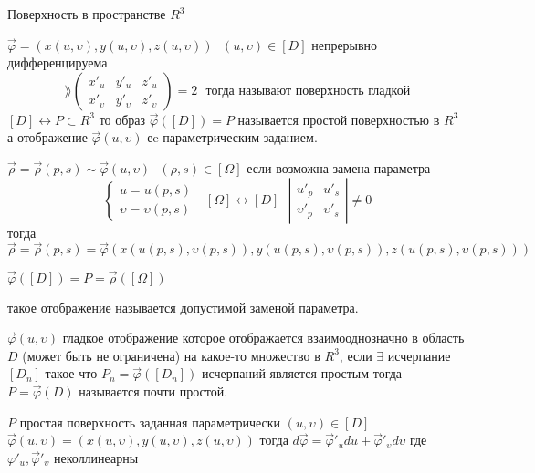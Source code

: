 \begin{title}
  Поверхность в пространстве $R^3$
\end{title}

\begin{define}
  $\vec \varphi = (x(u, \upsilon) , y(u, \upsilon), z(u, \upsilon)) ~~~
  (u, \upsilon) \in [D]$ непрерывно дифференцируема
  $$
  \rang \left(
  \begin{array}{ccc}
    x'_u & y'_u & z'_u \\
    x'_{\upsilon} & y'_{\upsilon} & z'_{\upsilon}
  \end{array}
  \right) = 2 ~~~
  \text{тогда называют поверхность гладкой}
  $$
  $[D] \leftrightarrow P \subset R^3$ то образ $\vec \varphi([D]) = P$
  называется простой поверхностью в $R^3$ а отображение
  $\vec \varphi(u, \upsilon)$ еe параметрическим заданием.
\end{define}

\begin{define}
  $\vec \rho = \vec \rho(p,s) \sim \vec \varphi(u, \upsilon) ~~~
  (\rho, s) \in [\Omega]$ если возможна замена параметра
  $$
  \left\{
  \begin{array}{l}
    u = u(p,s) \\
    \upsilon = \upsilon(p,s)
  \end{array}
  \right. ~~~ [\Omega] \leftrightarrow [D] ~~~
  \left|
  \begin{array}{cc}
    u'_p & u'_s \\
    \upsilon'_p & \upsilon'_s
  \end{array}
  \right| \not = 0
  $$
  тогда $\vec \rho = \vec \rho(p,s) = \vec \varphi (x(u(p,s), \upsilon(p,s)),
  y(u(p,s), \upsilon(p,s)), z(u(p,s), \upsilon(p,s)))$

  $\vec \varphi ([D]) = P = \vec \rho([\Omega])$

  такое отображение называется допустимой заменой параметра.
\end{define}

\begin{define}
  $\vec \varphi(u, \upsilon)$ гладкое отображение которое отображается
  взаимооднозначно в область $D$
  (может быть не ограничена) на какое-то множество в $R^3$, если $\exists$
  исчерпание $[D_n]$ такое что $P_n = \vec \varphi ([D_n])$ исчерпаний
  является простым тогда $P =
  \vec \varphi(D)$ называется почти простой.
\end{define}

\begin{theorem}
  $P$ простая поверхность заданная параметрически $(u, \upsilon) \in [D]$
  $\vec \varphi (u, \upsilon) = (x(u, \upsilon), y(u, \upsilon),
  z(u, \upsilon))$ тогда $d\vec \varphi = \vec \varphi'_udu +
  \vec \varphi'_{\upsilon} d\upsilon$ где $\varphi'_u, \vec \varphi'_{\upsilon}$
  неколлинеарны
\end{theorem}

